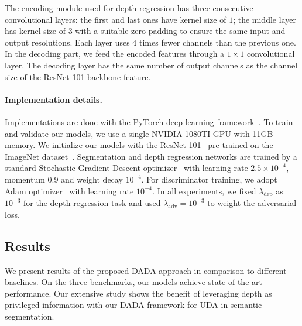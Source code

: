 \documentclass[10pt,twocolumn,letterpaper]{article}
\newcommand{\dep}{\mathrm{dep}}
\newcommand{\adv}{\mathrm{adv}}
\begin{document}
The encoding module used for depth regression has three consecutive convolutional layers: the first and last ones have kernel size of $1$; the middle layer has kernel size of $3$ with a suitable zero-padding to ensure the same input and output resolutions. Each layer uses $4$ times fewer channels than the previous one.
In the decoding part, we feed the encoded features through a $1\times1$ convolutional layer.
The decoding layer has the same number of output channels as the channel size of the ResNet-101 backbone feature.

\vspace{-0.3cm}
\paragraph{Implementation details.}
Implementations are done with the PyTorch deep learning framework~\cite{paszke2017automatic}.
To train and validate our models, we use a single NVIDIA 1080TI GPU with 11GB memory.
We initialize our models with the ResNet-101~\cite{He2015} pre-trained on the ImageNet dataset~\cite{deng2009imagenet}.
Segmentation and depth regression networks are trained by a standard Stochastic Gradient Descent optimizer~\cite{bottou2010large} with learning rate $2.5\times 10^{-4}$, momentum $0.9$ and weight decay $10^{-4}$. 
For discriminator training, we adopt Adam optimizer~\cite{kingma2014adam} with learning rate $10^{-4}$.
In all experiments, we fixed $\lambda_{\dep}$ as $10^{-3}$ for the depth regression task and used $\lambda_{\adv} = 10^{-3}$ to weight the adversarial loss.
\subsection{Results} \label{sec:exp_res}

We present results of the proposed DADA approach in comparison to different baselines.
On the three benchmarks, our models achieve state-of-the-art performance.
Our extensive study shows the benefit of leveraging depth as privileged information with our DADA framework for UDA in semantic segmentation.

\vspace{-0.3cm}
\end{document}
